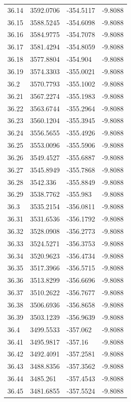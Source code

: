 \begin{table}[H]
\begin{tabular}{llll}
36.14 & 3592.0706 & -354.5117 & -9.8088 \\
36.15 & 3588.5245 & -354.6098 & -9.8088 \\
36.16 & 3584.9775 & -354.7078 & -9.8088 \\
36.17 & 3581.4294 & -354.8059 & -9.8088 \\
36.18 & 3577.8804 & -354.904 & -9.8088 \\
36.19 & 3574.3303 & -355.0021 & -9.8088 \\
36.2 & 3570.7793 & -355.1002 & -9.8088 \\
36.21 & 3567.2274 & -355.1983 & -9.8088 \\
36.22 & 3563.6744 & -355.2964 & -9.8088 \\
36.23 & 3560.1204 & -355.3945 & -9.8088 \\
36.24 & 3556.5655 & -355.4926 & -9.8088 \\
36.25 & 3553.0096 & -355.5906 & -9.8088 \\
36.26 & 3549.4527 & -355.6887 & -9.8088 \\
36.27 & 3545.8949 & -355.7868 & -9.8088 \\
36.28 & 3542.336 & -355.8849 & -9.8088 \\
36.29 & 3538.7762 & -355.983 & -9.8088 \\
36.3 & 3535.2154 & -356.0811 & -9.8088 \\
36.31 & 3531.6536 & -356.1792 & -9.8088 \\
36.32 & 3528.0908 & -356.2773 & -9.8088 \\
36.33 & 3524.5271 & -356.3753 & -9.8088 \\
36.34 & 3520.9623 & -356.4734 & -9.8088 \\
36.35 & 3517.3966 & -356.5715 & -9.8088 \\
36.36 & 3513.8299 & -356.6696 & -9.8088 \\
36.37 & 3510.2622 & -356.7677 & -9.8088 \\
36.38 & 3506.6936 & -356.8658 & -9.8088 \\
36.39 & 3503.1239 & -356.9639 & -9.8088 \\
36.4 & 3499.5533 & -357.062 & -9.8088 \\
36.41 & 3495.9817 & -357.16 & -9.8088 \\
36.42 & 3492.4091 & -357.2581 & -9.8088 \\
36.43 & 3488.8356 & -357.3562 & -9.8088 \\
36.44 & 3485.261 & -357.4543 & -9.8088 \\
36.45 & 3481.6855 & -357.5524 & -9.8088 \\

\end{tabular}
\end{table}
